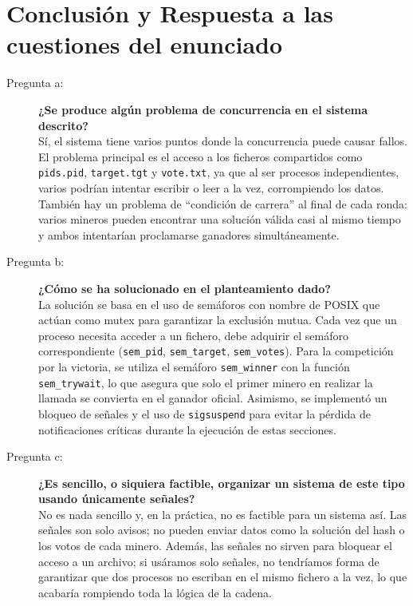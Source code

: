\documentclass[11pt,a4paper]{article}
\begin{document}
\section{Conclusión y Respuesta a las cuestiones del enunciado}
\begin{description}
    \item[Pregunta a:] \textbf{¿Se produce algún problema de concurrencia en el sistema descrito?} \hfill \\
    Sí, el sistema tiene varios puntos donde la concurrencia puede causar fallos. 
    El problema principal es el acceso a los ficheros compartidos como \texttt{pids.pid}, \texttt{target.tgt} y \texttt{vote.txt}, 
    ya que al ser procesos independientes, varios podrían intentar escribir o leer a la vez, corrompiendo los datos. También hay un problema de 
    ``condición de carrera'' al final de cada ronda: varios mineros pueden encontrar una solución válida casi al mismo tiempo y ambos intentarían 
    proclamarse ganadores simultáneamente.
    
    \item[Pregunta b:] \textbf{¿Cómo se ha solucionado en el planteamiento dado?} \hfill \\
    La solución se basa en el uso de semáforos con nombre de POSIX que actúan como mutex para garantizar la exclusión mutua. 
    Cada vez que un proceso necesita acceder a un fichero, debe adquirir el semáforo correspondiente (\texttt{sem\_pid}, \texttt{sem\_target}, 
    \texttt{sem\_votes}). Para la competición por la victoria, se utiliza el semáforo \texttt{sem\_winner} con la función \texttt{sem\_trywait}, 
    lo que asegura que solo el primer minero en realizar la llamada se convierta en el ganador oficial. Asimismo, se implementó un bloqueo de señales y el uso de \texttt{sigsuspend}
     para evitar la pérdida de notificaciones críticas durante la ejecución de estas secciones.

    \item[Pregunta c:] \textbf{¿Es sencillo, o siquiera factible, organizar un sistema de este tipo usando únicamente señales?} \hfill \\
    No es nada sencillo y, en la práctica, no es factible para un sistema así. Las señales son solo avisos; no pueden enviar datos 
    como la solución del hash o los votos de cada minero. Además, las señales no sirven para bloquear el acceso a un archivo; si usáramos solo señales,
     no tendríamos forma de garantizar que dos procesos no escriban en el mismo fichero a la vez, lo que acabaría rompiendo toda la lógica de la cadena.


\end{description}
\end{document}

